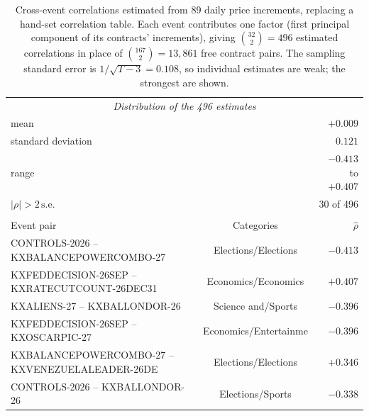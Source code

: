 \begin{table}[b]
\caption{\label{tab:correlations}Cross-event correlations estimated from 89 daily price increments, replacing a hand-set correlation table.  Each event contributes one factor (first principal component of its contracts' increments), giving $\binom{32}{2}=496$ estimated correlations in place of $\binom{167}{2}=13,861$ free contract pairs.  The sampling standard error is $1/\sqrt{T-3}=0.108$, so individual estimates are weak; the strongest are shown.}
\begin{ruledtabular}
\begin{tabular}{lcr}
\multicolumn{3}{c}{\textit{Distribution of the 496 estimates}} \\
\colrule
mean & & $+0.009$ \\
standard deviation & & $0.121$ \\
range & & $-0.413$ to $+0.407$ \\
$|\rho|>2\,\mathrm{s.e.}$ & & 30 of 496 \\
\colrule
\multicolumn{3}{c}{\textit{Strongest estimated pairs}} \\
\colrule
Event pair & Categories & $\hat\rho$ \\
\colrule
CONTROLS-2026 -- KXBALANCEPOWERCOMBO-27 & Elections/Elections & $-0.413$ \\
KXFEDDECISION-26SEP -- KXRATECUTCOUNT-26DEC31 & Economics/Economics & $+0.407$ \\
KXALIENS-27 -- KXBALLONDOR-26 & Science and/Sports & $-0.396$ \\
KXFEDDECISION-26SEP -- KXOSCARPIC-27 & Economics/Entertainme & $-0.396$ \\
KXBALANCEPOWERCOMBO-27 -- KXVENEZUELALEADER-26DE & Elections/Elections & $+0.346$ \\
CONTROLS-2026 -- KXBALLONDOR-26 & Elections/Sports & $-0.338$ \\
\end{tabular}
\end{ruledtabular}
\end{table}
